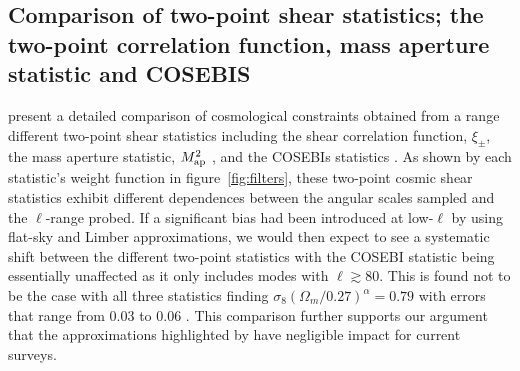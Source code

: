 \subsection{Comparison of two-point shear statistics; the two-point correlation function, mass aperture statistic and COSEBIS}
\citet{kilbinger/etal:2013} present a detailed comparison of cosmological constraints obtained from a range different two-point shear statistics including the shear correlation function, $\xi_\pm$, the mass aperture statistic, $M_ {\rm ap}^2$ \citep{schneider/etal:1998}, and the COSEBIs statistics \citep{schneider/etal:2010}.  As shown by each statistic's weight function in figure~\ref{fig:filters}, these two-point cosmic shear statistics exhibit different dependences between the angular scales sampled and the $\ell$-range probed.   If a significant bias had been introduced at low-$\ell$ by using flat-sky and Limber approximations, we would then expect to see a systematic shift between the different two-point statistics with the COSEBI statistic being essentially unaffected as it only includes modes with $\ell \gtrsim 80$.  This is found not to be the case with all three statistics finding $\sigma_8 (\Omega_m/0.27)^\alpha = 0.79$ with errors that range from $0.03$ to $0.06$ \citep[see Table 5 of][]{kilbinger/etal:2013}.  This comparison further supports our argument that the approximations highlighted by \citet{kitching/etal:2016} have negligible impact for current surveys.

